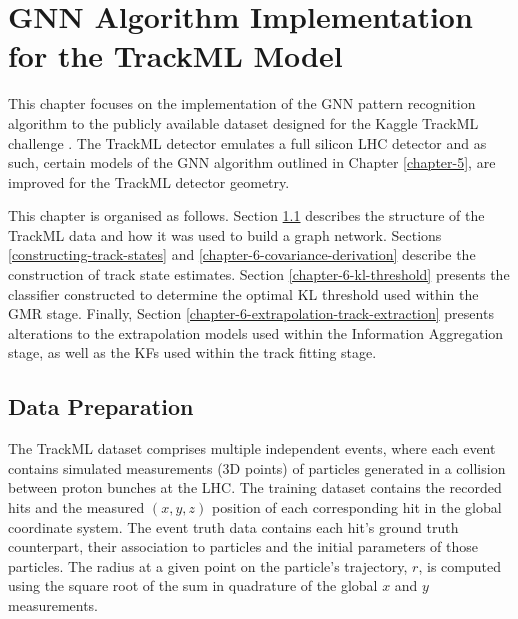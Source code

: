 


\chapter{GNN Algorithm Implementation for the TrackML Model}
\label{chapter-6}

This chapter focuses on the implementation of the GNN pattern recognition algorithm to the publicly available dataset designed for the Kaggle TrackML challenge \cite{kaggle-trackml}. The TrackML detector emulates a full silicon LHC detector and as such, certain models of the GNN algorithm outlined in Chapter \ref{chapter-5}, are improved for the TrackML detector geometry.

This chapter is organised as follows. Section \ref{chapter-6-data-prep} describes the structure of the TrackML data and how it was used to build a graph network. Sections \ref{constructing-track-states} and \ref{chapter-6-covariance-derivation} describe the construction of track state estimates. Section \ref{chapter-6-kl-threshold} presents the classifier constructed to determine the optimal KL threshold used within the GMR stage. Finally, Section \ref{chapter-6-extrapolation-track-extraction} presents alterations to the extrapolation models used within the Information Aggregation stage, as well as the KFs used within the track fitting stage. 
 


\section{Data Preparation}
\label{chapter-6-data-prep}

The TrackML dataset \cite{kaggle-trackml-data} comprises multiple independent events, where each event contains simulated measurements (3D points) of particles generated in a collision between proton bunches at the LHC. The training dataset contains the recorded hits and the measured $(x, y, z)$ position of each corresponding hit in the global coordinate system. The event truth data contains each hit's ground truth counterpart, their association to particles and the initial parameters of those particles. The radius at a given point on the particle's trajectory, $r$, is computed using the square root of the sum in quadrature of the global $x$ and $y$ measurements.

